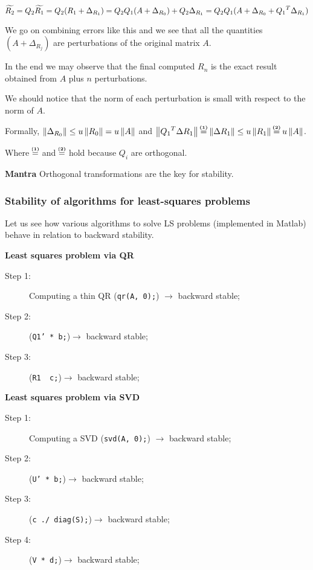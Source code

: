 \documentclass[computational_mathematics.tex]{subfiles}
\begin{document}
\[
  \widetilde{R_2} = Q_2 \widetilde{R_1} = Q_2 (R_1 + \Delta_{R_1}) = Q_2 Q_1 (A + \Delta_{R_0}) + Q_2 \Delta_{R_1} = Q_2 Q_1 (A + \Delta_{R_0} + {Q_1}^{T} \Delta_{R_1})
\]

We go on combining errors like this and we see that all the quantities $(A + \Delta_{R_j})$ are perturbations of the original matrix $A$.

In the end we may observe that the final computed $R_n$ is the exact result obtained from $A$ plus $n$ perturbations.

\begin{obs}
  We should notice that the norm of each perturbation is small with respect to the norm of $A$.
  
  Formally, $\left\lVert\Delta_{R_0}\right\rVert \le u \left\lVert R_0\right\rVert = u \left\lVert A\right\rVert$ and $\norm{\tr{Q_1} \Delta R_1} \numeq{(1)} \norm{\Delta R_1} \le u \norm{R_1} \numeq{(2)} u \norm{A}$.

  Where $\numeq{(1)}$ and $\numeq{(2)}$ hold because $Q_i$ are orthogonal. 
\end{obs}

\begin{myframe}{{\large {}} \textbf{Mantra}}
Orthogonal transformations are the key for stability. 
\end{myframe}

\subsubsection{Stability of algorithms for least-squares problems}
Let us see how various algorithms to solve LS problems (implemented in Matlab) behave in relation to backward stability.

\textbf{Least squares problem via QR}
\begin{description}
  \item[{\sc Step 1:}] Computing a thin QR (\texttt{qr(A, 0);}) $\rightarrow$ backward stable;
  \item[{\sc Step 2:}] (\texttt{Q1' * b;})$\rightarrow$ backward stable;
  \item[{\sc Step 3:}] (\texttt{R1 \ c;})$\rightarrow$ backward stable;
\end{description}


\textbf{Least squares problem via SVD}
\begin{description}
  \item[{\sc Step 1:}] Computing a SVD (\texttt{svd(A, 0);}) $\rightarrow$ backward stable;
  \item[{\sc Step 2:}] (\texttt{U' * b;})$\rightarrow$ backward stable;
  \item[{\sc Step 3:}] (\texttt{c ./ diag(S);})$\rightarrow$ backward stable;
  \item[{\sc Step 4:}] (\texttt{V * d;})$\rightarrow$ backward stable; 
\end{description}
\end{document}
